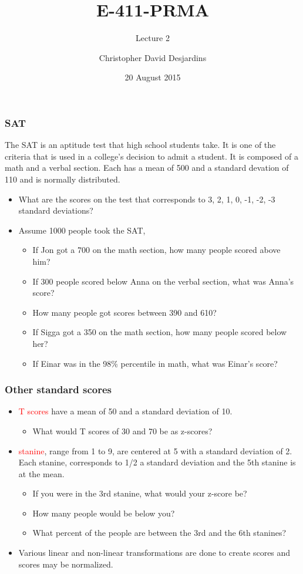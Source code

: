 \documentclass[dvipsnames]{beamer}\usepackage[]{graphicx}\usepackage[]{color}
\title{E-411-PRMA}
\subtitle{Lecture 2}
\author{Christopher David Desjardins}
\date{20 August 2015}
\begin{document}
\frame{\titlepage}


\begin{frame}
  \frametitle{SAT}
  
  The SAT is an aptitude test that high school students take. It is one of the criteria that is used in a college's decision to admit a student. It is composed of a math and a verbal section. Each has a mean of 500 and a standard devation of 110 and is normally distributed. 
  \begin{itemize}
  \item<1-> What are the scores on the test that corresponds to 3, 2, 1, 0, -1, -2, -3 standard deviations?
  \item<2-> Assume 1000 people took the SAT,
  \begin{itemize}
    \item<3-> If Jon got a 700 on the math section, how many people scored above him?
    \item<4-> If 300 people scored below Anna on the verbal section, what was Anna's score?
    \item<5-> How many people got scores between 390 and 610?
    \item<6-> If Sigga got a 350 on the math section, how many people scored below her?
    \item<7-> If Einar was in the 98\% percentile in math, what was Einar's score?
  \end{itemize}
  \end{itemize}
\end{frame}


\begin{frame}
\frametitle{Other standard scores}
\begin{itemize}
  \item<1-> \textcolor{red}{T scores} have a mean of 50 and a standard deviation of 10.
    \begin{itemize}
      \item<2-> What would T scores of 30 and 70 be as z-scores?
    \end{itemize}
    \item<3-> \textcolor{red}{stanine}, range from 1 to 9, are centered at 5 with a standard deviation of 2. Each stanine, corresponds to 1/2 a standard deviation and the 5th stanine is at the mean.
      \begin{itemize}
        \item<4-> If you were in the 3rd stanine, what would your z-score be?
        \item<5-> How many people would be below you?
        \item<6-> What percent of the people are between the 3rd and the 6th stanines?
      \end{itemize}
      \item<7-> Various linear and non-linear transformations are done to create scores and scores may be normalized.
\end{itemize}
\end{frame}
\end{document}
